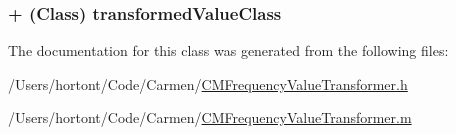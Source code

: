 \hypertarget{interface_c_m_frequency_value_transformer_80cd9a0a3b46f2657044c2b1e5c67778}{
\subsubsection[transformedValueClass]{\setlength{\rightskip}{0pt plus 5cm}+ (Class) transformedValueClass }}
\label{interface_c_m_frequency_value_transformer_80cd9a0a3b46f2657044c2b1e5c67778}




The documentation for this class was generated from the following files:\begin{CompactItemize}
\item 
/Users/hortont/Code/Carmen/\hyperlink{_c_m_frequency_value_transformer_8h}{CMFrequencyValueTransformer.h}\item 
/Users/hortont/Code/Carmen/\hyperlink{_c_m_frequency_value_transformer_8m}{CMFrequencyValueTransformer.m}\end{CompactItemize}
